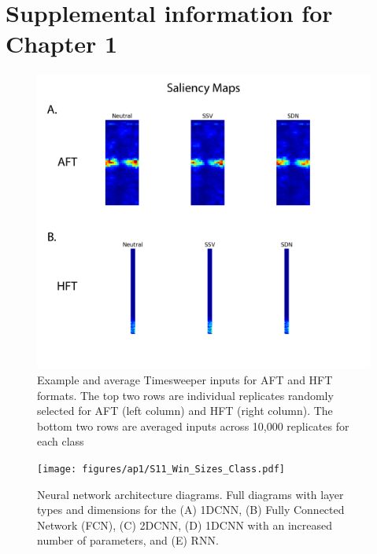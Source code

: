 \chapter{Supplemental information for Chapter 1}

\begin{figure}
    \centering
    \includegraphics[width=\textwidth]{figures/ap1/S10_Saliency_maps.pdf}
    \caption[Example and average Timesweeper inputs for AFT and HFT formats.]{Example and average Timesweeper inputs for AFT and HFT formats. The top two rows are individual replicates randomly selected for AFT (left column) and HFT (right column). The bottom two rows are averaged inputs across 10,000 replicates for each class}
    \label{fig:S10_Saliency_maps}
\end{figure}

\begin{figure}
    \centering
    \texttt{[image: figures/ap1/S11\_Win\_Sizes\_Class.pdf]}
    \caption[Neural network architecture diagrams.]{Neural network architecture diagrams. Full diagrams with layer types and dimensions for the (A) 1DCNN, (B) Fully Connected Network (FCN), (C) 2DCNN, (D) 1DCNN with an increased number of parameters, and (E) RNN.}
    \label{fig:S11_Win_Sizes_Class}
\end{figure}

